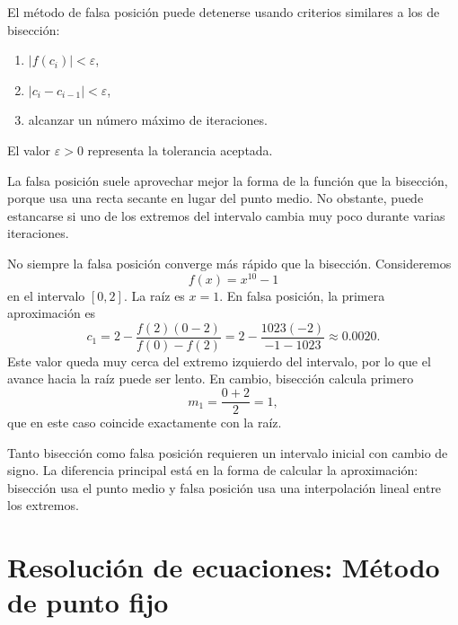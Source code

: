 \documentclass[a4,11pt]{aleph-notas}
\begin{document}
\begin{defi}
    El método de falsa posición puede detenerse usando criterios similares a los de bisección:
    \begin{enumerate}
        \item $|f(c_i)|<\varepsilon$,
        \item $|c_i-c_{i-1}|<\varepsilon$,
        \item alcanzar un número máximo de iteraciones.
    \end{enumerate}
    El valor $\varepsilon>0$ representa la tolerancia aceptada.
\end{defi}

\begin{advertencia}
    La falsa posición suele aprovechar mejor la forma de la función que la bisección, porque usa una recta secante en lugar del punto medio. No obstante, puede estancarse si uno de los extremos del intervalo cambia muy poco durante varias iteraciones.
\end{advertencia}

\begin{ejem}
    No siempre la falsa posición converge más rápido que la bisección. Consideremos
    \[
        f(x)=x^{10}-1
    \]
    en el intervalo $[0,2]$. La raíz es $x=1$. En falsa posición, la primera aproximación es
    \[
        c_1
        =2-\frac{f(2)(0-2)}{f(0)-f(2)}
        =2-\frac{1023(-2)}{-1-1023}
        \approx 0.0020.
    \]
    Este valor queda muy cerca del extremo izquierdo del intervalo, por lo que el avance hacia la raíz puede ser lento. En cambio, bisección calcula primero
    \[
        m_1=\frac{0+2}{2}=1,
    \]
    que en este caso coincide exactamente con la raíz.
\end{ejem}

\begin{advertencia}
    Tanto bisección como falsa posición requieren un intervalo inicial con cambio de signo. La diferencia principal está en la forma de calcular la aproximación: bisección usa el punto medio y falsa posición usa una interpolación lineal entre los extremos.
\end{advertencia}



\section{Resolución de ecuaciones: Método de punto fijo}
\end{document}
